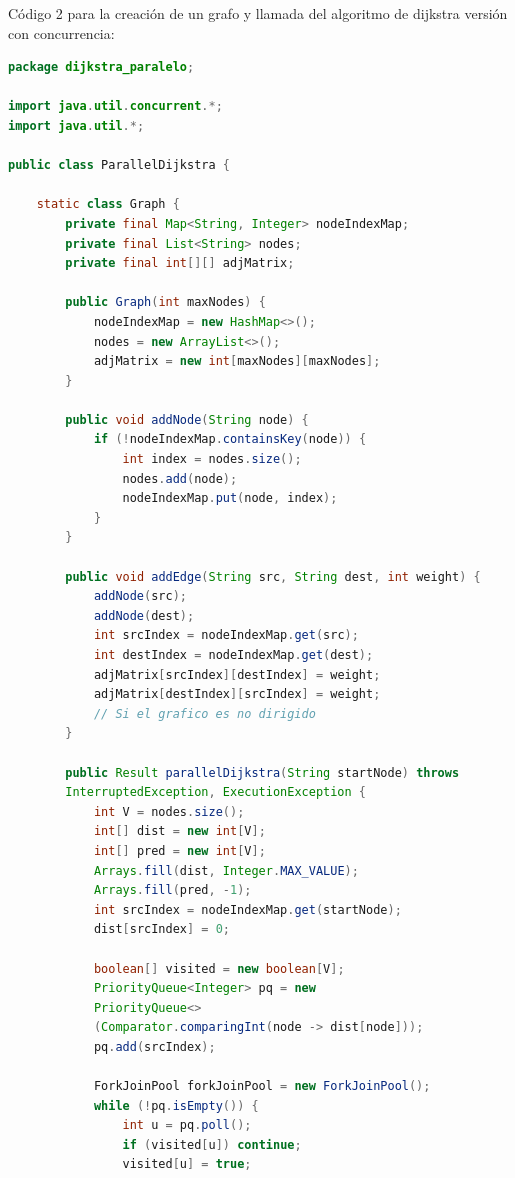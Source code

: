 Código 2 para la creación de un grafo y llamada del algoritmo de dijkstra versión con concurrencia:
\begin{lstlisting}[language=Java, style=ColorStyle]
package dijkstra_paralelo;

import java.util.concurrent.*;
import java.util.*;

public class ParallelDijkstra {

    static class Graph {
        private final Map<String, Integer> nodeIndexMap;
        private final List<String> nodes;
        private final int[][] adjMatrix;

        public Graph(int maxNodes) {
            nodeIndexMap = new HashMap<>();
            nodes = new ArrayList<>();
            adjMatrix = new int[maxNodes][maxNodes];
        }

        public void addNode(String node) {
            if (!nodeIndexMap.containsKey(node)) {
                int index = nodes.size();
                nodes.add(node);
                nodeIndexMap.put(node, index);
            }
        }

        public void addEdge(String src, String dest, int weight) {
            addNode(src);
            addNode(dest);
            int srcIndex = nodeIndexMap.get(src);
            int destIndex = nodeIndexMap.get(dest);
            adjMatrix[srcIndex][destIndex] = weight;
            adjMatrix[destIndex][srcIndex] = weight; 
            // Si el grafico es no dirigido
        }

        public Result parallelDijkstra(String startNode) throws
        InterruptedException, ExecutionException {
            int V = nodes.size();
            int[] dist = new int[V];
            int[] pred = new int[V];
            Arrays.fill(dist, Integer.MAX_VALUE);
            Arrays.fill(pred, -1);
            int srcIndex = nodeIndexMap.get(startNode);
            dist[srcIndex] = 0;

            boolean[] visited = new boolean[V];
            PriorityQueue<Integer> pq = new 
            PriorityQueue<>
            (Comparator.comparingInt(node -> dist[node]));
            pq.add(srcIndex);

            ForkJoinPool forkJoinPool = new ForkJoinPool();
            while (!pq.isEmpty()) {
                int u = pq.poll();
                if (visited[u]) continue;
                visited[u] = true;


\end{lstlisting}
